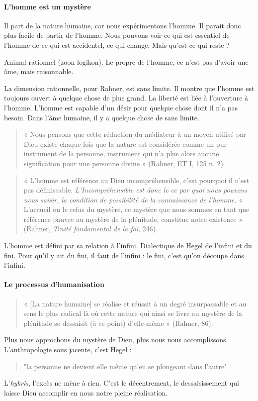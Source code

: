 \paragraph{L’homme est un mystère } Il part de la nature humaine, car nous expérimentons l'homme. Il parait donc plus facile de partir de l'homme. Nous pouvons voir ce qui est essentiel de l'homme de ce qui est accidentel, ce qui change.  Mais qu'est ce qui reste ?

\begin{Def}
Animal rationnel (zoon logikon). Le propre de l'homme, ce n'est pas d'avoir une âme, mais raisonnable.
\end{Def}

La dimension rationnelle, pour Rahner, est sans limite. 
Il montre que l'homme est toujours ouvert à quelque chose de plus grand. La liberté est liée à l'ouverture à l'homme. L'homme est capable d'un désir pour quelque chose dont il n'a pas besoin. Dans l'âme humaine, il y a quelque chose de sans limite. 


\begin{quote}
    « Nous pensons que cette réduction du médiateur à un moyen utilisé par Dieu existe chaque fois que la nature est considérée comme un pur instrument de la personne, instrument qui n’a plus alors aucune signification pour une personne divine » (Rahner, ET I, 125 n. 2)
\end{quote}

\begin{quote}
    « L’homme est référence au Dieu incompréhensible, c’est pourquoi il n’est pas définissable. \textit{L’Incompréhensible est donc le ce par quoi nous pouvons nous saisir, la condition de possibilité de la connaissance de l’homme.} « L’accueil ou le refus du mystère, ce mystère que nous sommes en tant que référence pauvre au mystère de la plénitude, constitue notre existence » (Rahner, \textit{Traité fondamental de la foi}, 246).  
\end{quote}
L'homme est défini par sa relation à l'infini. Dialectique de Hegel de l'infini et du fini. Pour qu'il y ait du fini, il faut de l'infini : le fini, c'est qu'on découpe dans l'infini. 

\paragraph{Le processus d’humanisation}  

\begin{quote}
    « [La nature humaine] se réalise et réussit à un degré insurpassable et au sens le plus radical là où cette nature qui ainsi se livre au mystère de la plénitude se dessaisit (à ce point) d’elle-même » (Rahner, 86).  
\end{quote}
Plus nous approchons du mystère de Dieu, plus nous nous accomplissons. L'anthropologie sous jacente, c'est Hegel : 
\begin{quote}
    "la personne ne devient elle même qu'en se plongeant dans l'autre"
\end{quote}
L'\textit{hybris}, l'excès ne mène à rien. C'est le décentrement, le dessaisissement qui laisse Dieu accomplir en nous notre pleine réalisation.

